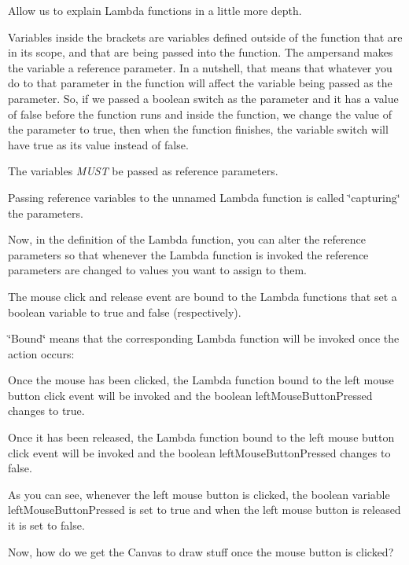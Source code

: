 Allow us to explain Lambda functions in a little more depth.

Variables inside the brackets are variables defined outside of the function that are in its scope, and that are being passed into the function. The ampersand makes the variable a reference parameter. In a nutshell, that means that whatever you do to that parameter in the function will affect the variable being passed as the parameter. So, if we passed a boolean {\ttfamily switch} as the parameter and it has a value of {\ttfamily false} before the function runs and inside the function, we change the value of the parameter to {\ttfamily true}, then when the function finishes, the variable {\ttfamily switch} will have {\ttfamily true} as its value instead of {\ttfamily false}.

The variables {\itshape M\-U\-S\-T} be passed as reference parameters.

Passing reference variables to the unnamed Lambda function is called \char`\"{}capturing\char`\"{} the parameters.

Now, in the definition of the Lambda function, you can alter the reference parameters so that whenever the Lambda function is invoked the reference parameters are changed to values you want to assign to them.

The mouse click and release event are bound to the Lambda functions that set a boolean variable to true and false (respectively).

\char`\"{}\-Bound\char`\"{} means that the corresponding Lambda function will be invoked once the action occurs\-:


\begin{DoxyItemize}
\item Once the mouse has been clicked, the Lambda function bound to the left mouse button click event will be invoked and the boolean {\ttfamily left\-Mouse\-Button\-Pressed} changes to true.
\item Once it has been released, the Lambda function bound to the left mouse button click event will be invoked and the boolean {\ttfamily left\-Mouse\-Button\-Pressed} changes to false.
\end{DoxyItemize}

As you can see, whenever the left mouse button is clicked, the boolean variable {\ttfamily left\-Mouse\-Button\-Pressed} is set to true and when the left mouse button is released it is set to false.

Now, how do we get the Canvas to draw stuff once the mouse button is clicked?


